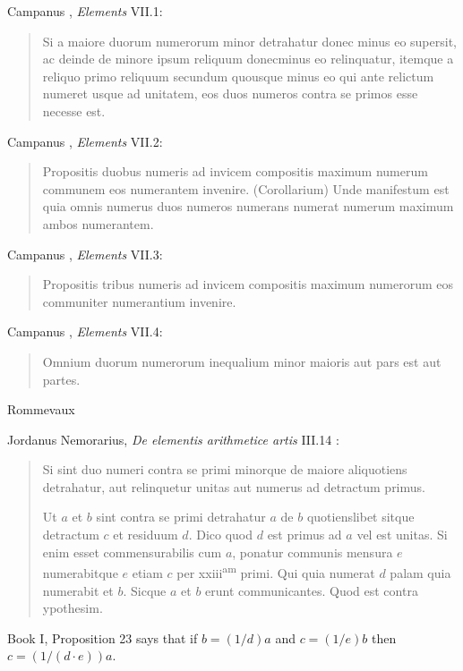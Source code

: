 \documentclass{article}
\begin{document}
Campanus \cite[p.~231]{campanusI}, {\em Elements} VII.1: 

\begin{quote}
Si a maiore duorum numerorum minor detrahatur donec minus
eo supersit, ac deinde de minore ipsum reliquum donecminus eo
relinquatur, itemque a reliquo primo reliquum secundum quousque minus eo
qui ante relictum numeret usque ad unitatem, eos duos numeros contra se
primos esse necesse est.
\end{quote}

Campanus \cite[p.~232]{campanusI}, {\em Elements} VII.2: 

\begin{quote}
Propositis duobus numeris ad invicem compositis maximum numerum communem eos numerantem invenire.
(Corollarium) Unde manifestum est quia omnis numerus duos numeros numerans numerat numerum 
maximum ambos numerantem.
\end{quote}

Campanus \cite[p.~233]{campanusI}, {\em Elements} VII.3: 

\begin{quote}
Propositis tribus numeris ad invicem compositis maximum
numerorum eos communiter numerantium invenire.
\end{quote}

Campanus \cite[p.~234]{campanusI}, {\em Elements} VII.4: 

\begin{quote}
Omnium duorum numerorum inequalium minor maioris aut pars
est aut partes.
\end{quote}

Rommevaux \cite{rommevaux}

Jordanus Nemorarius, {\em De elementis arithmetice artis} III.14 \cite[pp.~87--88]{jordanus}:

\begin{quote}
Si sint duo numeri contra se primi minorque de maiore aliquotiens
detrahatur, aut relinquetur unitas aut numerus ad detractum primus.

Ut $a$ et $b$ sint contra se primi detrahatur $a$ de $b$ quotienslibet sitque
detractum $c$ et residuum $d$. Dico quod $d$ est primus ad $a$ vel est unitas. Si enim
esset commensurabilis cum $a$, ponatur communis mensura $e$ numerabitque $e$
etiam $c$ per xxiii\textsuperscript{am} primi. Qui quia numerat $d$ palam quia numerabit et $b$. Sicque
$a$ et $b$ erunt communicantes. Quod est contra ypothesim.
\end{quote}

Book I, Proposition 23 says that if $b=(1/d) a$ and $c=(1/e) b$ then $c=(1/(d\cdot e)) a$.   
\end{document}
